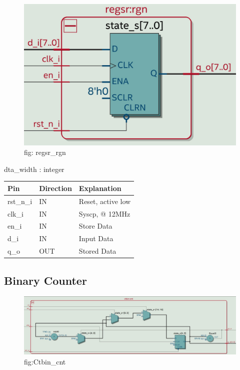 \documentclass[12pt,a4 paper] {article}
\begin{document}
\begin{figure}[h]
	\centering	
	\includegraphics[scale=0.2]{../png/regsr_rgn.png}
	\newline
	fig: regsr\_rgn\\
\end{figure}
dta\_width : integer\\
\begin{center}
	\begin{tabular}{| p{2cm} | p{2cm} | p{4cm} |}
		\hline
		Pin & Direction  & Explanation\\
		\hline	
 		 rst\_n\_i & IN &   Reset, active low\\
 		 \hline
		clk\_i   & IN  &      Syscp, @ 12MHz\\
		\hline
		en\_i    & IN  &   Store Data\\
		\hline
		d\_i     & IN  & Input Data\\
		\hline
		q\_o     & OUT & Stored Data\\
		\hline
		
	\end{tabular}
\end{center}



\newpage
\subsection{Binary Counter}

\begin{figure}[h]
	\centering	
	\includegraphics[scale=0.2]{../png/Ctbin_cnt .jpeg}
	\newline
	fig:Ctbin\_cnt\\
\end{figure}
\end{document}
